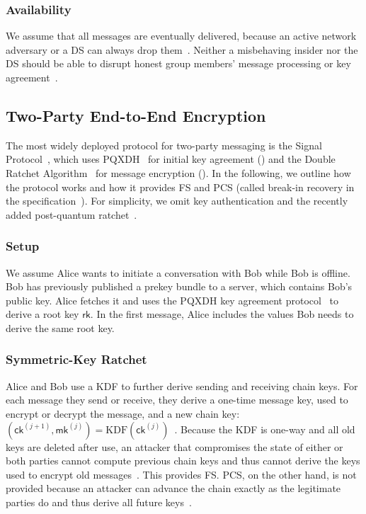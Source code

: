 \documentclass[conference]{IEEEtran}
\begin{document}
\subsubsection{Availability}
We assume that all messages are eventually delivered, because an active network adversary or a \ac{DS} can always drop them~\cite{beurdoucheMessagingLayerSecurity2025}.
Neither a misbehaving insider nor the \ac{DS} should be able to disrupt honest group members' message processing or key agreement~\cite{alwenContinuousGroupKey2020,devigneMLSGroupMessaging2021}.


\subsection{Two-Party End-to-End Encryption}
The most widely deployed protocol for two-party messaging is the Signal Protocol~\cite{balbasWhatsUppSenderKeys2023}, which uses PQXDH~\cite{kretPQXDHKeyAgreement} for initial key agreement () and the Double Ratchet Algorithm~\cite{perrinDoubleRatchetAlgorithm} for message encryption ().
In the following, we outline how the protocol works and how it provides \ac{FS} and \ac{PCS} (called break-in recovery in the specification~\cite{perrinDoubleRatchetAlgorithm}).
For simplicity, we omit key authentication and the recently added post-quantum ratchet~\cite{perrinDoubleRatchetAlgorithm}.
\subsubsection{Setup}\label{sec:setup}
We assume Alice wants to initiate a conversation with Bob while Bob is offline.
Bob has previously published a prekey bundle to a server, which contains Bob's public key. Alice fetches it and uses the PQXDH key agreement protocol~\cite{kretPQXDHKeyAgreement} to derive a root key $\mathsf{rk}$.
In the first message, Alice includes the values Bob needs to derive the same root key.
\subsubsection{Symmetric-Key Ratchet}\label{sec:sym-ratchet}
Alice and Bob use a \ac{KDF} to further derive sending and receiving chain keys. For each message they send or receive, they derive a one-time message key, used to encrypt or decrypt the message, and a new chain key: $(\mathsf{ck}^{(j+1)}, \mathsf{mk}^{(j)}) = \mathrm{KDF}(\mathsf{ck}^{(j)})$~\cite{perrinDoubleRatchetAlgorithm}.
Because the \ac{KDF} is one-way and all old keys are deleted after use, an attacker that compromises the state of either or both parties cannot compute previous chain keys and thus cannot derive the keys used to encrypt old messages~\cite{perrinDoubleRatchetAlgorithm}.
This provides \ac{FS}. \ac{PCS}, on the other hand, is not provided because an attacker can advance the chain exactly as the legitimate parties do and thus derive all future keys~\cite{perrinDoubleRatchetAlgorithm,cohn-gordonPostcompromiseSecurity2016}.
\end{document}
